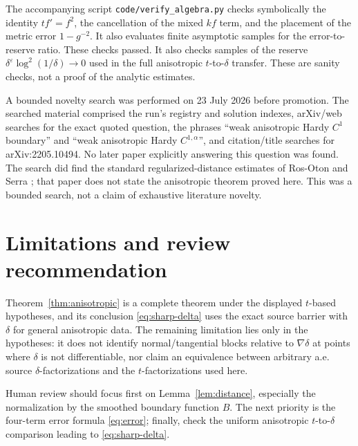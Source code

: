 \documentclass[11pt]{article}
\newcommand{\Grad}{\nabla}
\newcommand{\eps}{\varepsilon}
\begin{document}
The accompanying script \texttt{code/verify\_algebra.py} checks symbolically
the identity \(tf'=f^2\), the cancellation of the mixed \(kf\) term, and the
placement of the metric error \(1-g^{-2}\).  It also evaluates finite
asymptotic samples for the error-to-reserve ratio.  These checks passed.
It also checks samples of the reserve
\(\delta^\eps\log^2(1/\delta)\to0\) used in the full anisotropic
\(t\)-to-\(\delta\) transfer.  These are sanity checks, not a proof of the
analytic estimates.

A bounded novelty search was performed on 23 July 2026 before promotion.
The searched material comprised the run's registry and solution indexes,
arXiv/web searches for the exact quoted question, the phrases
``weak anisotropic Hardy \(C^1\) boundary'' and
``weak anisotropic Hardy \(C^{1,\alpha}\)'', and citation/title searches for
arXiv:2205.10494.  No later paper explicitly answering this question was
found.  The search did find the standard regularized-distance estimates of
Ros-Oton and Serra \cite{RosOtonSerra}; that paper does not state the
anisotropic theorem proved here.  This was a bounded search, not a claim of
exhaustive literature novelty.

\section{Limitations and review recommendation}

Theorem~\ref{thm:anisotropic} is a complete theorem under the displayed
\(t\)-based hypotheses, and its conclusion
\eqref{eq:sharp-delta} uses the exact source barrier with \(\delta\) for
general anisotropic data.  The remaining limitation lies only in the
hypotheses: it does not identify normal/tangential blocks relative to
\(\Grad\delta\) at points where \(\delta\) is not differentiable, nor claim
an equivalence between arbitrary a.e. source \(\delta\)-factorizations and
the \(t\)-factorizations used here.

Human review should focus first on Lemma~\ref{lem:distance}, especially the
normalization by the smoothed boundary function \(B\).  The next priority is
the four-term error formula \eqref{eq:error}; finally, check the uniform
anisotropic \(t\)-to-\(\delta\) comparison leading to
\eqref{eq:sharp-delta}.
\end{document}
